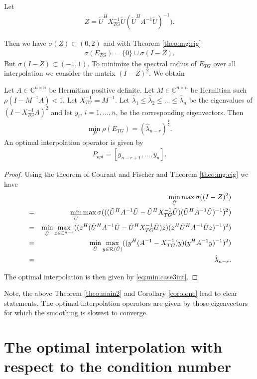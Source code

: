 \documentclass[final]{siamltex}
\newcommand{\beqo}{\begin{eqnarray*}}
\newcommand{\beq}{\begin{eqnarray}}
\newcommand{\eeqo}{\end{eqnarray*}}
\newcommand{\eeq}{\end{eqnarray}}
\numberwithin{equation}{section}
\newcommand{\ran} {{\cal R}}
\newcommand{\bC}{\mathbb{C}}
\newcommand{\inCnn}{\in \mathbb{C}^{n \times n}}
\begin{document}
Let 
\beqo
Z = \tilde U^HX_{TG}^{-1}\tilde U (\tilde U^HA^{-1}\tilde U)^{-1}).
\eeqo

Then we have $\sigma(Z) \subset (0,2)$ and with  Theorem \ref{theo:mg:eig}
\beqo
\sigma(E_{TG}) = \{0\} \cup \sigma(I-Z).
\eeqo
But $\sigma(I-Z) \subset (-1,1) $. To minimize the spectral radius of $E_{TG}$
over all interpolation we consider the matrix $(I - Z)^2$. We  obtain



\begin{theorem} \label{theo:main2}
Let  $A\inCnn$  be Hermitian positive definite. Let $ M \inCnn$ be Hermitian
such $\rho(I - M^{-1}A) < 1$.
Let $X_{TG}^{-1} =  M^{-1}$.   
 Let $
\hat \lambda_1 \leq \hat \lambda_2 \leq \ldots \leq  \hat \lambda_n $
be the  eigenvalues of $(I - X_{TG}^{-1}A)^2$  and let $y_i$, $i = 1, \ldots,
n$, be the corresponding eigenvectors. Then
\beq \label{eq:min.case3}
\min_{P}\rho(E_{TG}) = (\hat \lambda_{n-r})^{\frac{1}{2}}.
\eeq
An optimal interpolation operator is given by 
\beq  \label{eq:min.case3int}
P_{opt} = [y_{n-r+1}, \ldots , y_n].
\eeq
\end{theorem}
\begin{proof}
Using the theorem of Courant and Fischer and Theorem \ref{theo:mg:eig} we have
\beqo
& & \min_{\tilde U} \max \sigma((I - Z)^2) \\
& = & \min_{\tilde U} \max \sigma( ((\tilde U^HA^{-1}\tilde U - \tilde
U^HX_{TG}^{-1}\tilde U) (\tilde U^HA^{-1}\tilde U)^{-1})^2)\\
& = & \min_{\tilde U} \max_{z \in \bC ^{n-r}}  ((z^H(\tilde U^HA^{-1}\tilde U -
\tilde U^HX_{TG}^{-1}\tilde U)z) (z^H\tilde U^HA^{-1}\tilde Uz)^{-1})^2)\\
& = & \min_{\tilde U} \max_{y \in \ran (\tilde U)}  ((y^H(A^{-1} -
X_{TG}^{-1})y) (y^HA^{-1}y)^{-1})^2)\\
& = & \hat \lambda_{n-r}.
\eeqo
  
The optimal interpolation is then given by \eqref{eq:min.case3int}.
\end{proof}


Note, the above Theorem \ref{theo:main2} and  Corollary \ref{coro:one} lead to
clear statements. The optimal interpolation operators are given by those
eigenvectors for which the smoothing is slowest to converge.







\section{The optimal interpolation with respect to the  condition number}
\end{document}
